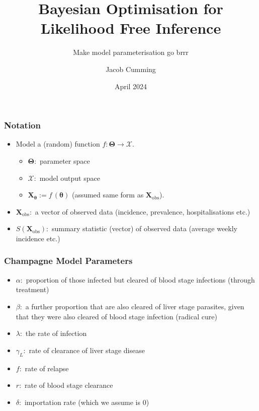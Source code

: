 \documentclass{beamer}
\title[BOLFI]{Bayesian Optimisation for Likelihood Free Inference}
\subtitle{Make model parameterisation go brrr}
\author{Jacob Cumming}
\institute{University of Melbourne, Walter and Eliza Hall Institute}
\date{April 2024}
\begin{document}
\frame{\titlepage}

\begin{frame}
    \frametitle{Notation}
    \begin{itemize}
        \item Model a (random) function $f:\bm{\Theta} \to \bm{\mathcal{X}}.$ 
        \begin{itemize}
            \item $\bm{\Theta}:$ parameter space
            \item $\bm{\mathcal{X}}:$ model output space 
            \item $\mathbf{X}_{\bm{\theta}} := f\,(\bm{\theta})$ (assumed same form as $\mathbf{X}_\text{obs}$).
        \end{itemize}
        \item <2-> $\mathbf{X}_\text{obs}:$ a vector of observed data (incidence, prevalence, hospitalisations etc.)
        \item <3-> $S(\mathbf{X}_\text{obs}):$ summary statistic (vector) of observed data (average weekly incidence etc.)
    \end{itemize}
\end{frame}



\begin{frame}
    \frametitle{Champagne Model Parameters}\begin{itemize}
        \item $\alpha:$ proportion of those infected but cleared of blood stage infections (through treatment)
        \item $\beta:$ a further proportion that are also cleared of liver stage parasites, given that they were also cleared of blood stage infection (radical cure)
        \item $\lambda:$ the rate of infection
        \item $\gamma_L:$ rate of clearance of liver stage disease
        \item $f:$ rate of relapse
        \item $r:$ rate of blood stage clearance
        \item $\delta:$ importation rate (which we assume is 0)
    \end{itemize}

\end{frame}
\end{document}
